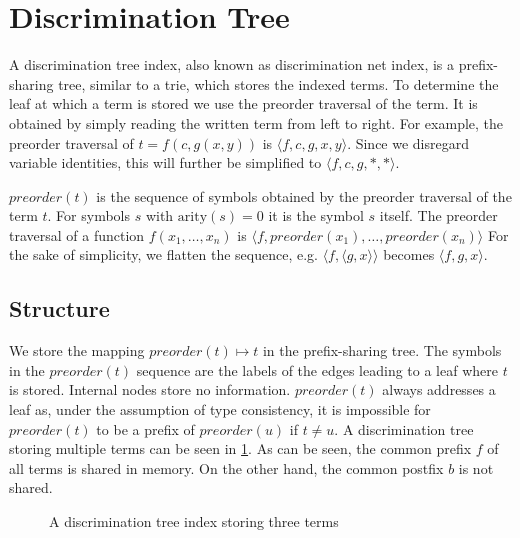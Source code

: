 \section{Discrimination Tree}
A discrimination tree index, also known as discrimination net index, is a prefix-sharing tree, similar to a trie, which stores the indexed terms. To determine the leaf at which a term is stored we use the preorder traversal of the term. It is obtained by simply reading the written term from left to right. For example, the preorder traversal of $t = f(c,g(x,y))$ is $\langle f,c,g,x,y \rangle$. Since we disregard variable identities, this will further be simplified to $\langle f,c,g,*,* \rangle$.

\begin{defn}
  $preorder(t)$ is the sequence of symbols obtained by the preorder traversal of the term $t$.
  For symbols $s$ with $\mathrm{arity}(s) = 0$ it is the symbol $s$ itself.
  The preorder traversal of a function $f(x_{1},\dots,x_{n})$ is $\langle f,preorder(x_{1}),\dots,preorder(x_{n}) \rangle$ For the sake of simplicity, we flatten the sequence, e.g. $\langle f,\langle g,x \rangle \rangle$ becomes $\langle f,g,x \rangle$.
\end{defn}

\subsection{Structure}
We store the mapping $preorder(t) \mapsto t$ in the prefix-sharing tree.
The symbols in the $preorder(t)$ sequence are the labels of the edges leading to a leaf where $t$ is stored.
Internal nodes store no information.
$preorder(t)$ always addresses a leaf as, under the assumption of type consistency, it is impossible for $preorder(t)$ to be a prefix of $preorder(u)$ if $t \neq u$.
A discrimination tree storing multiple terms can be seen in \cref{discnet}. As can be seen, the common prefix $f$ of all terms is shared in memory. On the other hand, the common postfix $b$ is not shared.

\begin{figure}[h]
  \centering
{}
  \caption{A discrimination tree index storing three terms} \label{discnet}
\end{figure}

